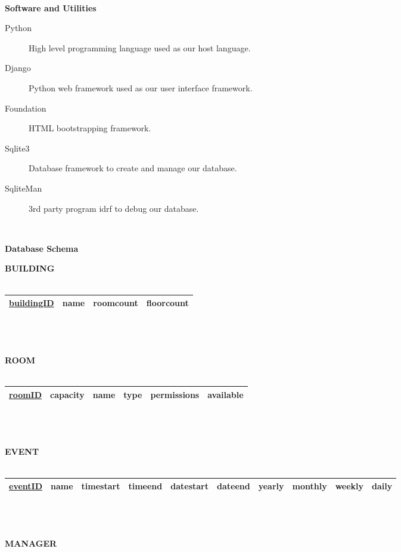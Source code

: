 \documentclass{article}
\begin{document}
\\\hline
\begin{center}\textbf{\large Software and Utilities}\end{center}
\begin{description}
    \item[Python] \hfill High level programming language used as our host language.
    \item[Django] \hfill Python web framework used as our user interface framework.
    \item[Foundation] \hfill HTML bootstrapping framework.
    \item[Sqlite3] \hfill Database framework to create and manage our database.
    \item[SqliteMan] \hfill 3rd party program idrf to debug our database.
\end{description}
\\\hline
\begin{center}\textbf{\large Database Schema}\end{center}
\textbf{\Large BUILDING}\\\\
\begin{tabular}{|c|l|l|l|}
    \hline
    \underline{buildingID} & name & roomcount & floorcount \\ \hline
\end{tabular}\\\\\\
\textbf{\Large ROOM}\\\\
\begin{tabular}{|c|l|l|l|l|l|}
    \hline
    \underline{roomID} & capacity & name & type & permissions & available \\ \hline
\end{tabular}\\\\\\
\textbf{\Large EVENT}\\\\
\begin{tabular}{|c|l|l|l|l|l|l|l|l|l|}
    \hline
    \underline{eventID} & name & timestart & timeend & datestart & dateend & yearly & monthly & weekly & daily \\ \hline
\end{tabular}\\\\\\
\textbf{\Large MANAGER}\\\\
\end{document}
